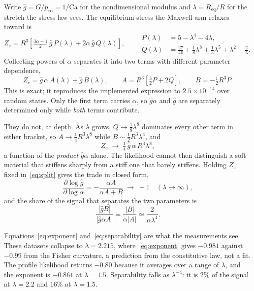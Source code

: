 \documentclass[10pt]{article}
\begin{document}
Write $\hat g = G/p_\infty = 1/\mathrm{Ca}$ for the nondimensional modulus and
$\lambda = R_{\mathrm{eq}}/R$ for the stretch the stress law sees. The equilibrium stress
the Maxwell arm relaxes toward is
%
\begin{equation}
Z_e = R^3\left[\tfrac{3\alpha-1}{2}\,\hat g\,P(\lambda) + 2\alpha\,\hat g\,Q(\lambda)\right],
\qquad
\begin{aligned}
P(\lambda) &= 5 - \lambda^4 - 4\lambda,\\
Q(\lambda) &= \tfrac{27}{40} + \tfrac{1}{8}\lambda^8 + \tfrac{1}{5}\lambda^5 + \lambda^2 - \tfrac{2}{\lambda}.
\end{aligned}
\label{eq:Ze}
\end{equation}
%
Collecting powers of $\alpha$ separates it into two terms with different parameter
dependence,
%
\begin{equation}
Z_e = \hat g\,\alpha\,A(\lambda) + \hat g\,B(\lambda),
\qquad
A = R^3\!\left[\tfrac32 P + 2Q\right],
\qquad
B = -\tfrac12 R^3 P .
\label{eq:split}
\end{equation}
%
This is exact; it reproduces the implemented expression to $2.5\times10^{-14}$ over random
states. Only the first term carries $\alpha$, so $\hat g\alpha$ and $\hat g$ are separately
determined only while \emph{both} terms contribute.

They do not, at depth. As $\lambda$ grows, $Q \to \tfrac18\lambda^8$ dominates every other
term in either bracket, so $A \to \tfrac14 R^3\lambda^8$ while $B \sim \tfrac12 R^3\lambda^4$,
and
%
\begin{equation}
Z_e \;\longrightarrow\; \tfrac14\,\hat g\,\alpha\,R^3\lambda^8 ,
\end{equation}
%
a function of the \emph{product} $\hat g\alpha$ alone. The likelihood cannot then distinguish
a soft material that stiffens sharply from a stiff one that barely stiffens. Holding $Z_e$
fixed in~\eqref{eq:split} gives the trade in closed form,
%
\begin{equation}
\frac{\partial \log \hat g}{\partial \log \alpha}
= -\frac{\alpha A}{\alpha A + B}
\;\longrightarrow\; -1 \quad (\lambda \to \infty),
\label{eq:exponent}
\end{equation}
%
and the share of the signal that separates the two parameters is
%
\begin{equation}
\frac{|\hat g B|}{|\hat g \alpha A|} = \frac{|B|}{\alpha|A|} \simeq \frac{2}{\alpha\lambda^4}.
\label{eq:separability}
\end{equation}

Equations~\eqref{eq:exponent} and~\eqref{eq:separability} are what the measurements see.
These datasets collapse to $\lambda = 2.215$, where~\eqref{eq:exponent} gives $-0.981$ against
$-0.99$ from the Fisher curvature, a prediction from the constitutive law, not a fit. The
profile likelihood returns $-0.80$ because it averages over a range of $\lambda$, and the
exponent is $-0.861$ at $\lambda = 1.5$. Separability falls as $\lambda^{-4}$: it is $2\%$ of
the signal at $\lambda = 2.2$ and $16\%$ at $\lambda = 1.5$.
\end{document}
